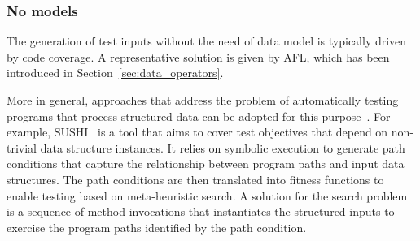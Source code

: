 \subsubsection{No models}


The generation of test inputs without the need of data model is typically driven by code coverage. A representative solution is given by AFL, which has been introduced in Section~\ref{sec:data_operators}. 

More in general, approaches that address the problem of automatically testing programs that process structured data can be adopted for this purpose~\cite{Kiran:2008,Braione:2017,Braione:2018}. For example, SUSHI~\cite{Braione:2018} is a tool that aims to cover test objectives that depend on non-trivial data structure instances. 
It relies on symbolic execution to generate path conditions that capture the relationship between program paths and input data structures. The path conditions are then translated into fitness functions to enable testing based on meta-heuristic search. A solution for the search problem is a sequence of method invocations that instantiates the structured inputs to exercise the program paths identified by the path condition. 




